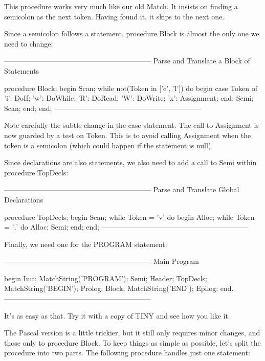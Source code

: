 \documentclass[float=false, crop=false]{standalone}
\begin{document}
This procedure works very much like our old Match. It insists on finding a
semicolon as the next token. Having found it, it skips to the next one.

Since a semicolon follows a statement, procedure Block is almost the only one we
need to change:

\begin{code}
{--------------------------------------------------------------}
{ Parse and Translate a Block of Statements }

procedure Block;
begin
   Scan;
   while not(Token in ['e', 'l']) do begin
      case Token of
       'i': DoIf;
       'w': DoWhile;
       'R': DoRead;
       'W': DoWrite;
       'x': Assignment;
      end;
      Semi;
      Scan;
   end;
end;
{--------------------------------------------------------------}
\end{code}

Note carefully the subtle change in the case statement. The call to Assignment
is now guarded by a test on Token. This is to avoid calling Assignment when the
token is a semicolon (which could happen if the statement is null).

Since declarations are also statements, we also need to add a call to Semi
within procedure TopDecls:

\begin{code}
{--------------------------------------------------------------}
{ Parse and Translate Global Declarations }

procedure TopDecls;
begin
   Scan;
   while Token = 'v' do begin
      Alloc;
      while Token = ',' do
         Alloc;
      Semi;
   end;
end;
{--------------------------------------------------------------}
\end{code}

Finally, we need one for the PROGRAM statement:

\begin{code}
{--------------------------------------------------------------}
{ Main Program }

begin
   Init;
   MatchString('PROGRAM');
   Semi;
   Header;
   TopDecls;
   MatchString('BEGIN');
   Prolog;
   Block;
   MatchString('END');
   Epilog;
end.
{--------------------------------------------------------------}
\end{code}

It's as easy as that. Try it with a copy of TINY and see how you like it.

The Pascal version is a little trickier, but it still only requires minor
changes, and those only to procedure Block. To keep things as simple as
possible, let's split the procedure into two parts. The following procedure
handles just one statement:
\end{document}
